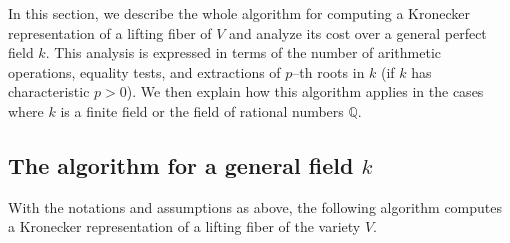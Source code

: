 \documentclass[pdflatex,sn-basic]{sn-jnl}%
\theoremstyle{thmstyleone}%
\theoremstyle{thmstyletwo}%
\theoremstyle{thmstylethree}%
\theoremstyle{definition}
\numberwithin{equation}{section}
\newcommand{\Q}{\mathbb Q}
\begin{document}
In this section, we describe the whole algorithm for computing a
Kronecker representation of a lifting fiber of $V$ and analyze its
cost over a general perfect field $k$. This analysis is expressed in
terms of the number of arithmetic operations, equality tests,
and extractions of $p$--th roots in $k$ (if $k$ has characteristic
$p>0$). We then explain how this algorithm applies in the cases
where $k$ is a finite field or the field of rational numbers $\Q$.
%
%
\subsection{The algorithm for a general field $k$}
%
With the notations and assumptions as above, the following algorithm computes a
Kronecker representation of a lifting fiber of the variety $V$.
%
%
\end{document}
